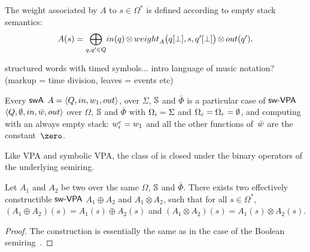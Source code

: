 %

\noindent
The weight associated by $A$ to $s \in \Omega^*$
is defined according to empty stack semantics: 
%
\begin{equation}
A(s)  = 
{\displaystyle\bigoplus_{q, q' \in Q}} \textstyle
\mathsf{in}(q) \mathop{\otimes} 
\weight_A\bigl(\config{q}{\bot}, s, \config{q'}{\bot}\bigr) 
\mathop{\otimes} \mathsf{out}(q').
\label{eq:weightA}
\end{equation}

\begin{example}
structured words with timed symbols...
intro language of music notation? (markup = time division, leaves = events etc)
\end{example}

\noindent 
Every $\textsf{swA}$ $A = \< Q, \init, {\wei_1}, \final >$,
over $\Sigma$, $\mathbb{S}$ and $\bar\Phi$
is a particular case of $\textsf{sw-VPA}$ 
$\< Q, \emptyset, \init, \bar\wei, \final >$ 
over $\Omega$, $\mathbb{S}$ and $\bar\Phi$
with $\Omegai = \Sigma$ and $\Omegac = \Omegar = \emptyset$,
and computing with an always empty stack:
$\weiei = \wei_1$ and all the other functions 
of~$\bar\wei$ are the constant~$\zero$.


\medskip\noindent
Like VPA and symbolic VPA, 
the class of \SWVPA is closed under the binary operators of the underlying semiring.
%
\begin{proposition}\label{prop:SWVPA-product}
Let $A_1$ and $A_2$ be two \SWVPA
over the same $\Omega$, $\mathbb{S}$ and $\bar\Phi$.
There exists two effectively constructible $\textsf{sw-VPA}$ 
$A_1 \oplus A_2$ and $A_1 \otimes A_2$,  
such that for all $s \in \Omega^*$, 
$(A_1 \oplus A_2)(s) = A_1(s) \oplus A_2(s)$ and 
$(A_1 \otimes A_2)(s) = A_1(s) \otimes A_2(s)$.
\end{proposition}
%
\begin{proof}
The construction is essentially the same 
as in the case of the Boolean semiring~\cite{dAntonyAlur14SVPDA}.
\end{proof}


